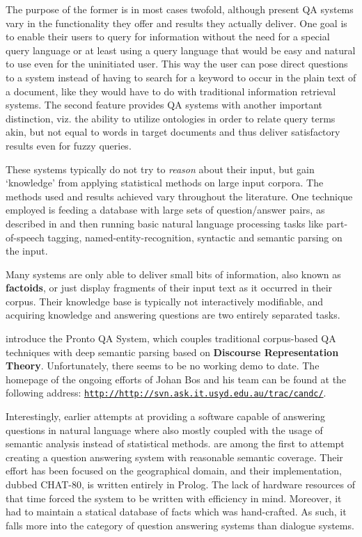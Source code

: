 \documentclass[a4paper]{article}
\newcommand{\abbr}{\textsf} %
\newcommand{\term}[1]{\textsf{\textbf{#1}}} %
\newcommand{\code}[1]{\texttt{#1}} %
\newcommand{\pn}{\textsf} %
\newcommand{\url}[1]{\code{http://#1}} %
\newcommand{\prol}{\pn{Prolog}}
\theoremstyle{remark}
\theoremstyle{remark}
\theoremstyle{definition}
\theoremstyle{definition}
\begin{document}
The purpose of the former is in most cases twofold, although present
\abbr{QA} systems vary in the functionality they offer
and results they actually deliver. One goal is to enable their users to
query for information without the need for a special query language or at least
using a query language that would be easy and natural to use even for the
uninitiated user. This way the user can pose direct questions to a system
instead of having to search for a keyword to occur in the plain text of a
document, like they would have to do with traditional information
retrieval systems. The second feature provides \abbr{QA} systems with another important
distinction, viz. the ability to utilize ontologies in order to relate query
terms akin, but not equal to words in target documents and thus deliver
satisfactory results even for fuzzy queries.

These systems typically do not try to \emph{reason} about
their input, but gain `knowledge' from applying statistical methods on large
input corpora. The methods used and results achieved vary throughout the
literature. One technique employed is feeding a database with large sets of
question/answer pairs, as described in \cite{rama} and then running basic
natural language processing tasks like part-of-speech tagging,
named-entity-recognition, syntactic and semantic parsing on the input.

Many systems are only able to deliver small bits of information, also known as
\term{factoids}, or just display fragments of their input text as it occurred in
their corpus. Their knowledge base is typically not interactively modifiable,
and acquiring knowledge and answering questions are two entirely separated
tasks.

\cite{prontoqa} introduce the \pn{Pronto QA System}, which couples traditional
corpus-based \abbr{QA} techniques with deep semantic parsing based on
\term{Discourse Representation Theory}. Unfortunately, there seems
to be no working demo to date. The homepage of the ongoing efforts of Johan Bos
and his team can be found at the following address:
\href{http://svn.ask.it.usyd.edu.au/trac/candc/}{\url{http://svn.ask.it.usyd.edu.au/trac/candc/}}.

Interestingly, earlier attempts at providing a software capable of answering
questions in natural language where also mostly coupled with the usage of
semantic analysis instead of statistical methods.
\cite{chat} are among  the first to attempt creating a question answering system
with reasonable semantic coverage. Their effort has been focused on the geographical
domain, and their implementation, dubbed \pn{CHAT-80}, is written entirely in
\prol. The lack of hardware resources of that time forced the system to be
written with efficiency in mind. Moreover, it had to maintain a statical
database of facts which was hand-crafted. As such, it falls more into the
category of question answering systems than dialogue systems.
\end{document}
